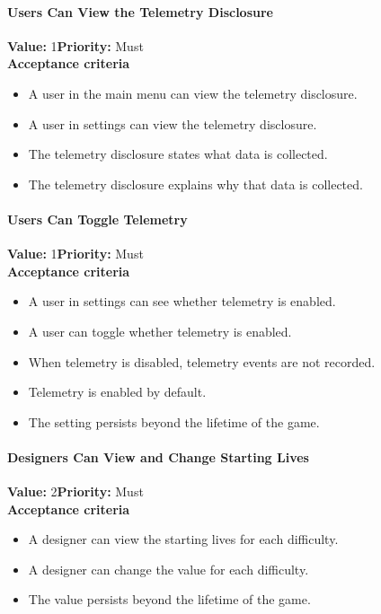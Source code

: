 \paragraph{Users Can View the Telemetry Disclosure}
\textbf{Value:} 1\quad \textbf{Priority:} Must\\
\textbf{Acceptance criteria}
\begin{itemize}
  \item A user in the main menu can view the telemetry disclosure.
  \item A user in settings can view the telemetry disclosure.
  \item The telemetry disclosure states what data is collected.
  \item The telemetry disclosure explains why that data is collected.
\end{itemize}

\paragraph{Users Can Toggle Telemetry}
\textbf{Value:} 1\quad \textbf{Priority:} Must\\
\textbf{Acceptance criteria}
\begin{itemize}
  \item A user in settings can see whether telemetry is enabled.
  \item A user can toggle whether telemetry is enabled.
  \item When telemetry is disabled, telemetry events are not recorded.
  \item Telemetry is enabled by default.
  \item The setting persists beyond the lifetime of the game.
\end{itemize}

\paragraph{Designers Can View and Change Starting Lives}
\textbf{Value:} 2\quad \textbf{Priority:} Must\\
\textbf{Acceptance criteria}
\begin{itemize}
  \item A designer can view the starting lives for each difficulty.
  \item A designer can change the value for each difficulty.
  \item The value persists beyond the lifetime of the game.
\end{itemize}

